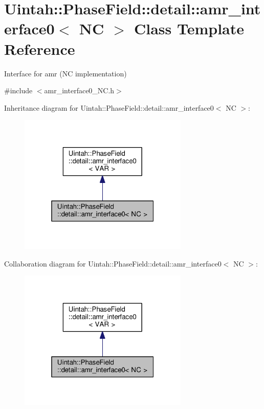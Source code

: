 \hypertarget{classUintah_1_1PhaseField_1_1detail_1_1amr__interface0_3_01NC_01_4}{}\section{Uintah\+:\+:Phase\+Field\+:\+:detail\+:\+:amr\+\_\+interface0$<$ NC $>$ Class Template Reference}
\label{classUintah_1_1PhaseField_1_1detail_1_1amr__interface0_3_01NC_01_4}


Interface for amr (NC implementation)  




{\ttfamily \#include $<$amr\+\_\+interface0\+\_\+\+N\+C.\+h$>$}



Inheritance diagram for Uintah\+:\+:Phase\+Field\+:\+:detail\+:\+:amr\+\_\+interface0$<$ NC $>$\+:\nopagebreak
\begin{figure}[H]
\begin{center}
\leavevmode
\includegraphics[width=229pt]{classUintah_1_1PhaseField_1_1detail_1_1amr__interface0_3_01NC_01_4__inherit__graph}
\end{center}
\end{figure}


Collaboration diagram for Uintah\+:\+:Phase\+Field\+:\+:detail\+:\+:amr\+\_\+interface0$<$ NC $>$\+:\nopagebreak
\begin{figure}[H]
\begin{center}
\leavevmode
\includegraphics[width=229pt]{classUintah_1_1PhaseField_1_1detail_1_1amr__interface0_3_01NC_01_4__coll__graph}
\end{center}
\end{figure}
